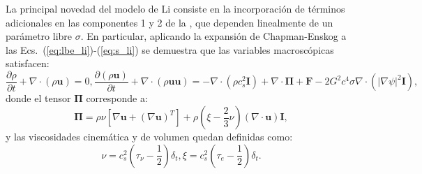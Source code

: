 La principal novedad del modelo de Li consiste en la incorporaci\'on de t\'erminos adicionales en las componentes 1 y 2 de la , que dependen linealmente de un par\'ametro libre $\sigma$. En particular, aplicando la expansi\'on de Chapman-Enskog a las Ecs.~(\ref{eq:lbe_li})-(\ref{eq:s_li}) se demuestra que las variables macrosc\'opicas satisfacen:
\begin{subequations}
	\begin{equation}
		\dfrac{\partial \rho}{\partial t} + \nabla \cdot (\rho \bm{u}) = 0,
	\end{equation}
\begin{equation}
	\dfrac{\partial (\rho \bm{u})}{\partial t} + \nabla \cdot (\rho \bm{uu}) = -\nabla \cdot (\rho c_s^2 \bm{I}) + \nabla \cdot \bm{\Pi} + \bm{F} - 2G^2 c^4 \sigma \nabla \cdot (|\nabla \psi|^2 \bm{I}),	
\end{equation}
\label{eq:li_macro}
\end{subequations}
donde el tensor $\bm{\Pi}$ corresponde a:
\begin{equation}
	\bm{\Pi} = \rho \nu \left[ \nabla \bm{u} + (\nabla \bm{u})^T \right] + \rho \left( \xi - \dfrac{2}{3}\nu \right) (\nabla \cdot \bm{u})\bm{I},
\end{equation}
y las viscosidades cinem\'atica y de volumen quedan definidas como:
\begin{subequations}
	\begin{equation}
		\nu = c_s^2 \left( \tau_{\nu} - \dfrac{1}{2}\right) \delta_t,
	\end{equation}
	\begin{equation}
		\xi = c_s^2 \left( \tau_{e} - \dfrac{1}{2}\right) \delta_t.
	\end{equation}	
\end{subequations}


